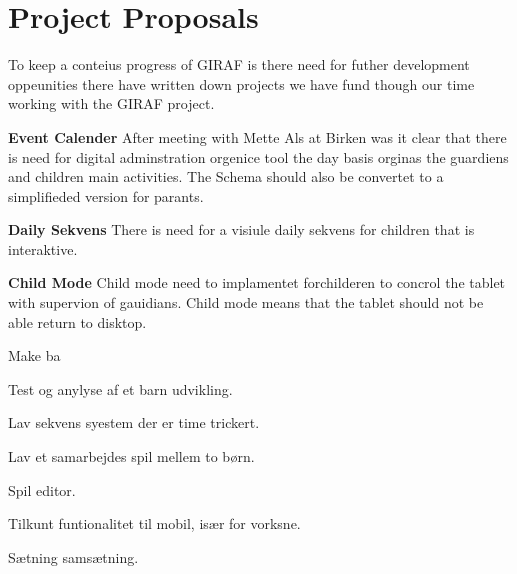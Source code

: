 \chapter{Project Proposals}
\label{chap:projectProposals}
To keep a conteius progress of GIRAF is there need for futher development oppeunities there have written down projects we have fund though our time working with the GIRAF project.   

\textbf{Event Calender} 
After meeting with Mette Als at Birken was it clear that there is need for digital adminstration orgenice tool the day basis orginas the guardiens and children main activities.
The Schema should also be convertet to a simplifieded version for parants.   

\textbf{Daily Sekvens}
There is need for a visiule daily sekvens for children that is interaktive.     

\textbf{Child Mode}
Child mode need to implamentet forchilderen to concrol the tablet with supervion of gauidians.
Child mode means that the tablet should not be able return to disktop.     

Make ba




Test og anylyse af et barn udvikling. 

Lav sekvens syestem der er time trickert.

Lav et samarbejdes spil mellem to børn. 

Spil editor.

Tilkunt funtionalitet til mobil, især for vorksne. 

Sætning samsætning.       

